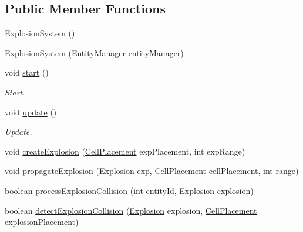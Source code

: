 \subsection*{Public Member Functions}
\begin{DoxyCompactItemize}
\item 
\hyperlink{classbr_1_1unb_1_1unbomber_1_1systems_1_1_explosion_system_a8620de4fb4bb615f10bee2acd8135b3b}{Explosion\+System} ()
\item 
\hyperlink{classbr_1_1unb_1_1unbomber_1_1systems_1_1_explosion_system_a8b976f0bf1b8e1a7ff8becf4c56b8d89}{Explosion\+System} (\hyperlink{interfacebr_1_1unb_1_1unbomber_1_1core_1_1_entity_manager}{Entity\+Manager} \hyperlink{classbr_1_1unb_1_1unbomber_1_1core_1_1_base_system_acb388352563da4567a9641f97b7931ca}{entity\+Manager})
\item 
void \hyperlink{classbr_1_1unb_1_1unbomber_1_1systems_1_1_explosion_system_a28adf0093944d029774eaca54ab864d4}{start} ()
\begin{DoxyCompactList}\small\item\em Start. \end{DoxyCompactList}\item 
void \hyperlink{classbr_1_1unb_1_1unbomber_1_1systems_1_1_explosion_system_a10219edb2dd683d8f5e3a19f57a356f3}{update} ()
\begin{DoxyCompactList}\small\item\em Update. \end{DoxyCompactList}\item 
void \hyperlink{classbr_1_1unb_1_1unbomber_1_1systems_1_1_explosion_system_af2408df4e5385f780bd61386b675900f}{create\+Explosion} (\hyperlink{classbr_1_1unb_1_1unbomber_1_1component_1_1_cell_placement}{Cell\+Placement} exp\+Placement, int exp\+Range)
\item 
void \hyperlink{classbr_1_1unb_1_1unbomber_1_1systems_1_1_explosion_system_ac1a24c3ff7c2d5de5d431b9951f19416}{propagate\+Explosion} (\hyperlink{classbr_1_1unb_1_1unbomber_1_1component_1_1_explosion}{Explosion} exp, \hyperlink{classbr_1_1unb_1_1unbomber_1_1component_1_1_cell_placement}{Cell\+Placement} cell\+Placement, int range)
\item 
boolean \hyperlink{classbr_1_1unb_1_1unbomber_1_1systems_1_1_explosion_system_a0baa1797f2ffb2ad84a5926f0097b932}{process\+Explosion\+Collision} (int entity\+Id, \hyperlink{classbr_1_1unb_1_1unbomber_1_1component_1_1_explosion}{Explosion} explosion)
\item 
boolean \hyperlink{classbr_1_1unb_1_1unbomber_1_1systems_1_1_explosion_system_a8dadead2a3a0ee7d8ddcd9451ff24b35}{detect\+Explosion\+Collision} (\hyperlink{classbr_1_1unb_1_1unbomber_1_1component_1_1_explosion}{Explosion} explosion, \hyperlink{classbr_1_1unb_1_1unbomber_1_1component_1_1_cell_placement}{Cell\+Placement} explosion\+Placement)
\end{DoxyCompactItemize}
